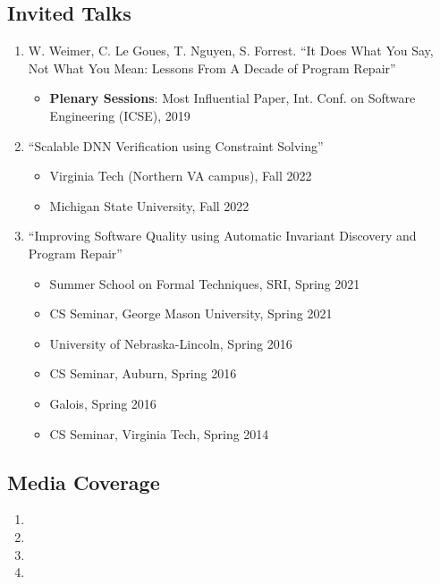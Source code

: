 \documentclass[11pt]{article}
\begin{document}
\subsection{Invited Talks}
\begin{enumerate}[label=T\arabic*]
\item W. Weimer, C. Le Goues, T. Nguyen, S. Forrest. ``It Does What You Say, Not What You Mean: Lessons From A Decade of Program Repair''
  \begin{itemize}[label={},before=\small]
  \item \textbf{Plenary Sessions}:  Most Influential Paper, Int. Conf. on Software Engineering (ICSE), 2019
\end{itemize}
  
\item ``Scalable DNN Verification using Constraint Solving''
  \begin{itemize}[label={},before=\small]
  \item Virginia Tech (Northern VA campus), Fall 2022
  \item Michigan State University, Fall 2022
  \end{itemize}
  
\item ``Improving Software Quality using Automatic Invariant Discovery and Program Repair''
  \begin{itemize}[label={},before=\small]
    \item Summer School on Formal Techniques, SRI, Spring 2021
    \item CS Seminar, George Mason University, Spring 2021
    \item University of Nebraska-Lincoln, Spring 2016
    \item CS Seminar, Auburn, Spring 2016
    \item Galois, Spring 2016
    \item CS Seminar, Virginia Tech, Spring 2014
  \end{itemize}
\end{enumerate}


\subsection{Media Coverage}
\begin{enumerate}[label=M\arabic*]
\item {}
\item {}  
\item {}
\item {}
\end{enumerate}
\end{document}
